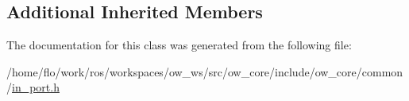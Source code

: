 \subsection*{Additional Inherited Members}


The documentation for this class was generated from the following file\+:\begin{DoxyCompactItemize}
\item 
/home/flo/work/ros/workspaces/ow\+\_\+ws/src/ow\+\_\+core/include/ow\+\_\+core/common/\hyperlink{in__port_8h}{in\+\_\+port.\+h}\end{DoxyCompactItemize}
